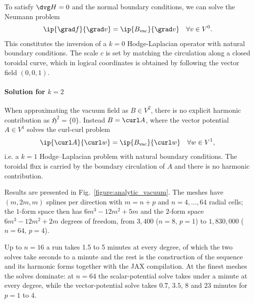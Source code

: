 \documentclass[%
 reprint,
 superscriptaddress,
 amsmath,amssymb,
 aps, nofootinbib, floatfix]{revtex4-2}
\begin{document}
To satisfy $\dvg H = 0$ and the normal boundary conditions, we can solve the Neumann problem
\begin{align}
    \ip{\grad f}{\grad v} = \ip{B_{\mathrm{vac}}}{\grad v} \quad \forall v \in V^0.
\end{align}
This constitutes the inversion of a $k=0$ Hodge-Laplacian operator with natural boundary conditions. The scale $c$ is set by matching the circulation along a closed toroidal curve, which in logical coordinates is obtained by following the vector field $(0,0,1)$.   



\paragraph{Solution for $k=2$}
When approximating the vacuum field as $B \in V^2$, there is no explicit harmonic contribution as $\mathfrak{H}^2 = \{0\}$. Instead $B = \curl A$, where the vector potential $A \in V^1$ solves the curl-curl problem
\begin{align}
    \ip{\curl A}{\curl w} = \ip{B_{\mathrm{vac}}}{\curl w}
    \quad \forall w \in V^1,
\end{align}
i.e. a $k=1$ Hodge--Laplacian problem with natural boundary conditions. The toroidal flux is carried by the boundary circulation of $A$ and there is no harmonic contribution.

Results are presented in Fig.~\ref{figure:analytic_vacuum}. The meshes have $(m, 2m, m)$ splines per direction with $m = n + p$ and $n = 4, \dots, 64$ radial cells; the $1$-form space then has $6m^3 - 12m^2 + 5m$ and the $2$-form space $6m^3 - 12m^2 + 2m$ degrees of freedom, from $3{,}400$ ($n = 8$, $p = 1$) to $1{,}830{,}000$ ($n = 64$, $p = 4$).

Up to $n = 16$ a run takes 1.5 to 5 minutes at every degree, of which the two solves take seconds to a minute and the rest is the construction of the sequence and its harmonic forms together with the JAX compilation. At the finest meshes the solves dominate: at $n = 64$ the scalar-potential solve takes under a minute at every degree, while the vector-potential solve takes $0.7$, $3.5$, $8$ and $23$ minutes for $p = 1$ to $4$.
\end{document}
